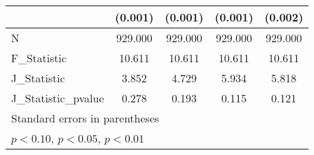{\begin{tabular}{l*{4}{c}}
            &     (0.001)         &     (0.001)         &     (0.001)         &     (0.002)         \\
\hline
N           &     929.000         &     929.000         &     929.000         &     929.000         \\
F\_Statistic &      10.611         &      10.611         &      10.611         &      10.611         \\
J\_Statistic &       3.852         &       4.729         &       5.934         &       5.818         \\
J\_Statistic\_pvalue&       0.278         &       0.193         &       0.115         &       0.121         \\
\hline\hline
\multicolumn{5}{l}{\footnotesize Standard errors in parentheses}\\
\multicolumn{5}{l}{\footnotesize \sym{*} \(p<0.10\), \sym{**} \(p<0.05\), \sym{***} \(p<0.01\)}\\
\end{tabular}
}

